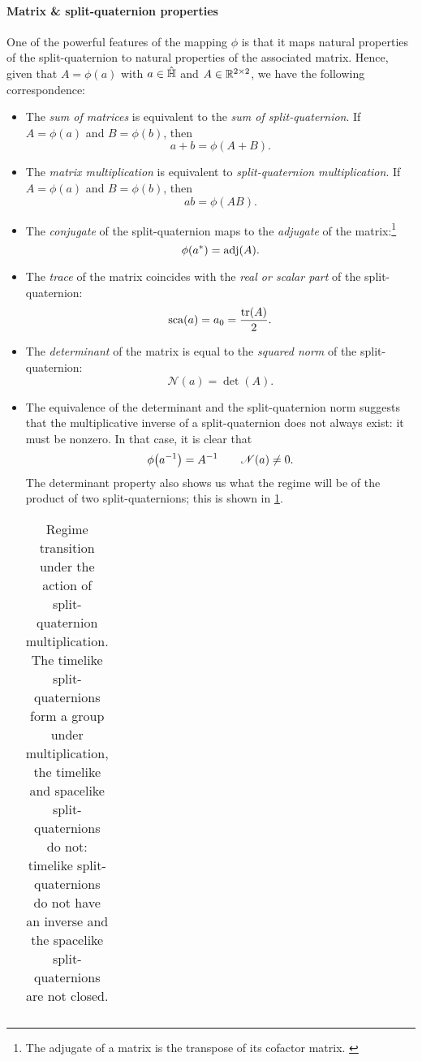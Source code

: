 \paragraph{Matrix \& split-quaternion properties} 
One of the powerful features of the mapping $\phi$ is that it maps natural properties of the split-quaternion to natural properties of the associated matrix. Hence, given that $A = \phi(a)$ with $a \in \hat{\mathbb{H}}$ and $A \in \mathbb{R}^{2\times2}$, we have the following correspondence: 
\begin{itemize}
    \item The \emph{sum of matrices} is equivalent to the \emph{sum of split-quaternion}. If $A = \phi(a)$ and $B = \phi(b)$, then
        $$ a + b = \phi(A + B). $$
    \item The \emph{matrix multiplication} is equivalent to \emph{split-quaternion multiplication}. If $A = \phi(a)$ and $B = \phi(b)$, then
        $$ ab = \phi(AB). $$
    \item The \emph{conjugate} of the split-quaternion maps to the \emph{adjugate} of the matrix:\footnote
        {The adjugate of a matrix is the transpose of its cofactor matrix. \cite{Verhaegen2007}}
        $$ \phi(a^*) = \operatorname{adj}(A). $$
    \item The \emph{trace} of the matrix coincides with the \emph{real or scalar part} of the split-quaternion:
        $$ \scapart{a} = a_0 = \frac{\trace(A)}{2}. $$
    \item The \emph{determinant} of the matrix is equal to the \emph{squared norm} of the split-quaternion:
        $$ \mathscr{N}(a) = \det(A). $$
    \item The equivalence of the determinant and the split-quaternion norm suggests that the multiplicative inverse of a split-quaternion does not always exist: it must be nonzero. In that case, it is clear that
        $$ \phi\qty(a^{-1}) = A^{-1} \qquad \mathscr{N}(a) \neq 0. $$
    The determinant property also shows us what the regime will be of the product of two split-quaternions; this is shown in \cref{tab:multiplication_class}.
        \begin{table}[h!]
        \centering
        \caption{Regime transition under the action of split-quaternion multiplication. The timelike split-quaternions form a group under multiplication, the timelike and spacelike split-quaternions do not: timelike split-quaternions do not have an inverse and the spacelike split-quaternions are not closed.}
        \label{tab:multiplication_class}
        \begin{tabular}{c|ccc}

\end{tabular}
\end{table}
\end{itemize}
